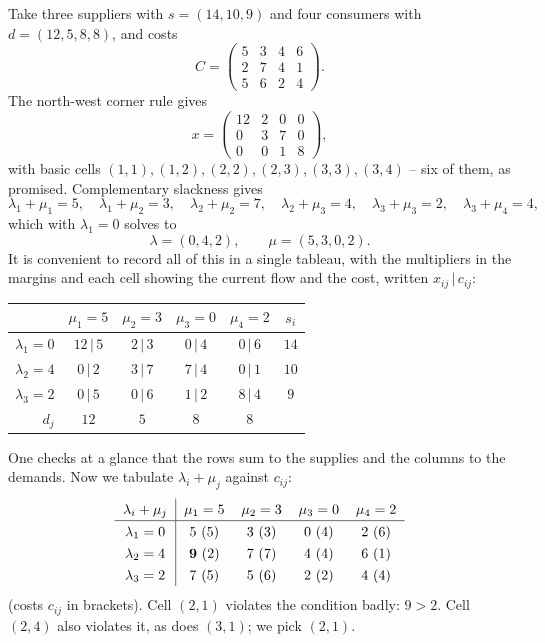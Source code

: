 \begin{example}
    Take three suppliers with $s = (14, 10, 9)$ and four consumers with $d = (12,5,8,8)$, and costs
    $$
    C = \begin{pmatrix} 5 & 3 & 4 & 6\\ 2 & 7 & 4 & 1\\ 5 & 6 & 2 & 4\end{pmatrix}.
    $$
    The north-west corner rule gives
    $$
    x = \begin{pmatrix}12 & 2 & 0 & 0\\ 0 & 3 & 7 & 0\\0&0&1&8\end{pmatrix},
    $$
    with basic cells $(1,1),(1,2),(2,2),(2,3),(3,3),(3,4)$ -- six of them, as promised. Complementary slackness gives
    $$
    \lambda_1 + \mu_1 = 5,\quad \lambda_1 + \mu_2 = 3,\quad \lambda_2 + \mu_2 = 7,\quad \lambda_2 + \mu_3 = 4,\quad \lambda_3+\mu_3 = 2,\quad \lambda_3 + \mu_4 = 4,
    $$
    which with $\lambda_1 = 0$ solves to
    $$
    \lambda = (0, 4, 2), \qquad \mu = (5, 3, 0, 2).
    $$
    It is convenient to record all of this in a single tableau, with the multipliers in the margins and each cell showing the current flow and the cost, written $x_{ij}\,|\,c_{ij}$:
    \begin{center}
    \begin{tabular}{r|cccc|c}
        & $\mu_1 = 5$ & $\mu_2 = 3$ & $\mu_3 = 0$ & $\mu_4 = 2$ & $s_i$\\\hline
        $\lambda_1 = 0$ & $12\,|\,5$ & $2\,|\,3$ & $0\,|\,4$ & $0\,|\,6$ & $14$\\
        $\lambda_2 = 4$ & $0\,|\,2$ & $3\,|\,7$ & $7\,|\,4$ & $0\,|\,1$ & $10$\\
        $\lambda_3 = 2$ & $0\,|\,5$ & $0\,|\,6$ & $1\,|\,2$ & $8\,|\,4$ & $9$\\\hline
        $d_j$ & $12$ & $5$ & $8$ & $8$ &
    \end{tabular}
    \end{center}
    One checks at a glance that the rows sum to the supplies and the columns to the demands. Now we tabulate $\lambda_i + \mu_j$ against $c_{ij}$:
    $$
    \arraycolsep=6pt\def\arraystretch{1.3}
    \begin{array}{c|cccc}
        \lambda_i + \mu_j & \mu_1 = 5 & \mu_2 = 3 & \mu_3 = 0 & \mu_4 = 2\\\hline
        \lambda_1 = 0 & 5\ (5) & 3\ (3) & 0\ (4) & 2\ (6)\\
        \lambda_2 = 4 & \mathbf{9}\ (2) & 7\ (7) & 4\ (4) & 6\ (1)\\
        \lambda_3 = 2 & 7\ (5) & 5\ (6) & 2\ (2) & 4\ (4)
    \end{array}
    $$
    (costs $c_{ij}$ in brackets). Cell $(2,1)$ violates the condition badly: $9 > 2$. Cell $(2,4)$ also violates it, as does $(3,1)$; we pick $(2,1)$.


\end{example}
